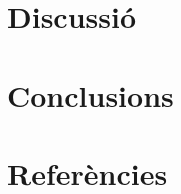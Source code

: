 \documentclass[
  a4paper]{article}
\begin{document}
\section{Discussió}\label{discussiuxf3}

\section{Conclusions}\label{conclusions}

\section{Referències}\label{referuxe8ncies}
\end{document}
